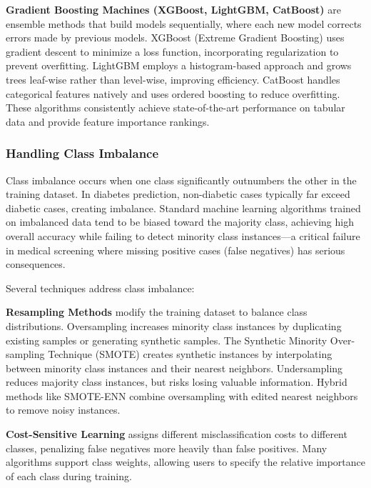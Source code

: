 
\textbf{Gradient Boosting Machines (XGBoost, LightGBM, CatBoost)} are ensemble methods that build models sequentially, where each new model corrects errors made by previous models. XGBoost (Extreme Gradient Boosting) uses gradient descent to minimize a loss function, incorporating regularization to prevent overfitting. LightGBM employs a histogram-based approach and grows trees leaf-wise rather than level-wise, improving efficiency. CatBoost handles categorical features natively and uses ordered boosting to reduce overfitting. These algorithms consistently achieve state-of-the-art performance on tabular data and provide feature importance rankings.

\subsubsection{Handling Class Imbalance}

Class imbalance occurs when one class significantly outnumbers the other in the training dataset. In diabetes prediction, non-diabetic cases typically far exceed diabetic cases, creating imbalance. Standard machine learning algorithms trained on imbalanced data tend to be biased toward the majority class, achieving high overall accuracy while failing to detect minority class instances—a critical failure in medical screening where missing positive cases (false negatives) has serious consequences.

Several techniques address class imbalance:

\textbf{Resampling Methods} modify the training dataset to balance class distributions. Oversampling increases minority class instances by duplicating existing samples or generating synthetic samples. The Synthetic Minority Over-sampling Technique (SMOTE) creates synthetic instances by interpolating between minority class instances and their nearest neighbors. Undersampling reduces majority class instances, but risks losing valuable information. Hybrid methods like SMOTE-ENN combine oversampling with edited nearest neighbors to remove noisy instances.

\textbf{Cost-Sensitive Learning} assigns different misclassification costs to different classes, penalizing false negatives more heavily than false positives. Many algorithms support class weights, allowing users to specify the relative importance of each class during training.

